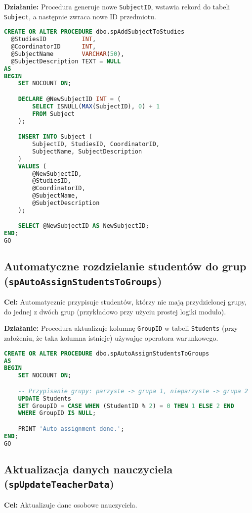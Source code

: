 \documentclass[12pt]{article}
\begin{document}
\textbf{Działanie:} Procedura generuje nowe \verb|SubjectID|, wstawia rekord do tabeli \verb|Subject|, a następnie zwraca nowe ID przedmiotu.

\begin{lstlisting}[language=SQL]
CREATE OR ALTER PROCEDURE dbo.spAddSubjectToStudies
  @StudiesID          INT,
  @CoordinatorID      INT,
  @SubjectName        VARCHAR(50),
  @SubjectDescription TEXT = NULL
AS
BEGIN
    SET NOCOUNT ON;

    DECLARE @NewSubjectID INT = (
        SELECT ISNULL(MAX(SubjectID), 0) + 1
        FROM Subject
    );

    INSERT INTO Subject (
        SubjectID, StudiesID, CoordinatorID,
        SubjectName, SubjectDescription
    )
    VALUES (
        @NewSubjectID, 
        @StudiesID,
        @CoordinatorID,
        @SubjectName,
        @SubjectDescription
    );

    SELECT @NewSubjectID AS NewSubjectID;
END;
GO
\end{lstlisting}

\newpage
\subsection{Automatyczne rozdzielanie studentów do grup (\texttt{spAutoAssignStudentsToGroups})}
\textbf{Cel:} Automatycznie przypisuje studentów, którzy nie mają przydzielonej grupy, do jednej z dwóch grup (przykładowo przy użyciu prostej logiki modulo).

\textbf{Działanie:} Procedura aktualizuje kolumnę \verb|GroupID| w tabeli \verb|Students| (przy założeniu, że taka kolumna istnieje) używając operatora warunkowego.

\begin{lstlisting}[language=SQL]
CREATE OR ALTER PROCEDURE dbo.spAutoAssignStudentsToGroups
AS
BEGIN
    SET NOCOUNT ON;

    -- Przypisanie grupy: parzyste -> grupa 1, nieparzyste -> grupa 2
    UPDATE Students
    SET GroupID = CASE WHEN (StudentID % 2) = 0 THEN 1 ELSE 2 END
    WHERE GroupID IS NULL;

    PRINT 'Auto assignment done.';
END;
GO
\end{lstlisting}

\newpage
\subsection{Aktualizacja danych nauczyciela (\texttt{spUpdateTeacherData})}
\textbf{Cel:} Aktualizuje dane osobowe nauczyciela.
\end{document}
